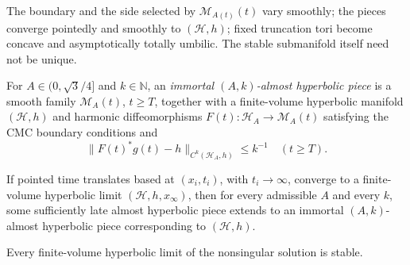 \begin{remark}
\label{rem:chow-iv-stable-hyperbolic-limit-properties}


The boundary and the side selected by \(\mathcal M_{A(t)}(t)\) vary smoothly;
the pieces converge pointedly and smoothly to \((\mathcal H,h)\); fixed
truncation tori become concave and asymptotically totally umbilic.  The stable
submanifold itself need not be unique.
\end{remark}

\begin{definition}
\label{def:chow-iv-immortal-almost-hyperbolic-piece}


For \(A\in(0,\sqrt3/4]\) and \(k\in\mathbb N\), an \emph{immortal
\((A,k)\)-almost hyperbolic piece} is a smooth family
\(\mathcal M_A(t)\), \(t\ge T\), together with a finite-volume hyperbolic
manifold \((\mathcal H,h)\) and harmonic diffeomorphisms
\(F(t):\mathcal H_A\to\mathcal M_A(t)\) satisfying the CMC boundary conditions
and
\[
 \|F(t)^*g(t)-h\|_{C^k(\mathcal H_A,h)}\le k^{-1}
 \quad(t\ge T).
\]
\end{definition}

\begin{proposition}
\label{prop:chow-iv-almost-hyperbolic-pieces-immortal}


If pointed time translates based at \((x_i,t_i)\), with \(t_i\to\infty\),
converge to a finite-volume hyperbolic limit \((\mathcal H,h,x_\infty)\), then
for every admissible \(A\) and every \(k\), some sufficiently late almost
hyperbolic piece extends to an immortal \((A,k)\)-almost hyperbolic piece
corresponding to \((\mathcal H,h)\).
\end{proposition}

\begin{proposition}
\label{prop:chow-iv-stability-hyperbolic-limits}


Every finite-volume hyperbolic limit of the nonsingular solution is stable.
\end{proposition}

